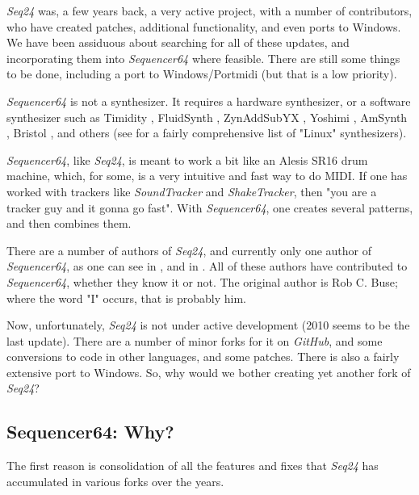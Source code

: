 \documentclass[
 11pt,
 twoside,
 a4paper,
 headinclude,
 footinclude,
 final                                 %
]{article}
\begin{document}
   \textsl{Seq24} was, a few years back, a very active project, with a
   number of contributors, who have created patches, additional
   functionality, and even ports to Windows.
   We have been assiduous about searching for all of these updates, and
   incorporating them into \textsl{Sequencer64} where feasible.
   There are still some things to be done, including a port to
   Windows/Portmidi (but that is a low priority).

   \textsl{Sequencer64} is not a synthesizer.  It requires a hardware
   synthesizer, or a software synthesizer such as Timidity \cite{timidity},
   FluidSynth \cite{fluidsynth}, ZynAddSubYX \cite{zynaddsubfx}, Yoshimi
   \cite{yoshimi} \cite{yoshimi2}, AmSynth \cite{amsynth}, Bristol
   \cite{bristol}, and others (see \cite{linuxsynths} for a fairly
   comprehensive list of "Linux" synthesizers).

   \textsl{Sequencer64}, like \textsl{Seq24},
   is meant to work a bit like an Alesis SR16 drum machine,
   which, for some, is a very intuitive and fast way to do MIDI.
   If one has worked with trackers like \textsl{SoundTracker} and
   \textsl{ShakeTracker}, then "you are a tracker guy and it gonna go fast".
   With \textsl{Sequencer64}, one creates several patterns, and then
   combines them.

   There are a number of authors of \textsl{Seq24}, and currently only
   one author of \textsl{Sequencer64},
   as one can see in ,
   and in .
   All of these authors have contributed to \textsl{Sequencer64}, whether
   they know it or not.
   The original author is Rob C. Buse; where the word "I" occurs, that is
   probably him.

   Now, unfortunately, \textsl{Seq24} is not under active
   development (2010 seems to be the last update).  There are a number of
   minor forks for it on \textsl{GitHub}, and some conversions
   to code in other languages, and some patches.
   There is also a fairly extensive port to Windows.
   So, why would we bother creating yet another fork of \textsl{Seq24}?

\subsection{Sequencer64: Why?}
\label{subsec:introduction_seq64_vs_others}

   The first reason is consolidation of all the features and fixes that
   \textsl{Seq24} has accumulated in various forks over the years.
\end{document}
